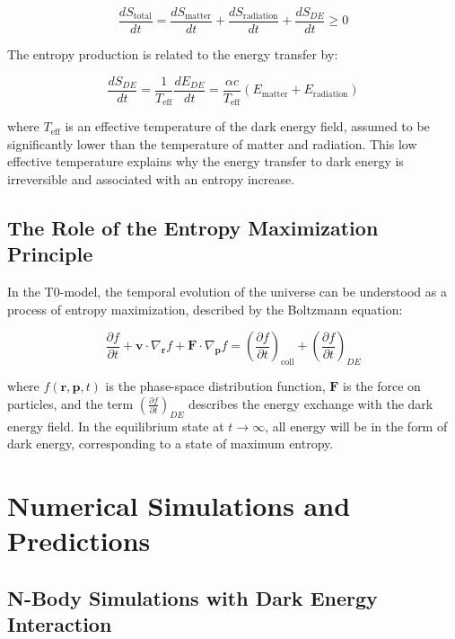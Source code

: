 \documentclass[a4paper,12pt]{article}
\theoremstyle{definition}
\theoremstyle{remark}
\begin{document}
	\begin{equation}
		\frac{dS_{\text{total}}}{dt} = \frac{dS_{\text{matter}}}{dt} + \frac{dS_{\text{radiation}}}{dt} + \frac{dS_{DE}}{dt} \geq 0
	\end{equation}
	
	The entropy production is related to the energy transfer by:
	
	\begin{equation}
		\frac{dS_{DE}}{dt} = \frac{1}{T_{\text{eff}}}\frac{dE_{DE}}{dt} = \frac{\alpha c}{T_{\text{eff}}}(E_{\text{matter}} + E_{\text{radiation}})
	\end{equation}
	
	where \(T_{\text{eff}}\) is an effective temperature of the dark energy field, assumed to be significantly lower than the temperature of matter and radiation. This low effective temperature explains why the energy transfer to dark energy is irreversible and associated with an entropy increase.
	
	\subsection{The Role of the Entropy Maximization Principle}
	
	In the T0-model, the temporal evolution of the universe can be understood as a process of entropy maximization, described by the Boltzmann equation:
	
	\begin{equation}
		\frac{\partial f}{\partial t} + \mathbf{v} \cdot \nabla_{\mathbf{r}} f + \mathbf{F} \cdot \nabla_{\mathbf{p}} f = \left(\frac{\partial f}{\partial t}\right)_{\text{coll}} + \left(\frac{\partial f}{\partial t}\right)_{DE}
	\end{equation}
	
	where \(f(\mathbf{r}, \mathbf{p}, t)\) is the phase-space distribution function, \(\mathbf{F}\) is the force on particles, and the term \(\left(\frac{\partial f}{\partial t}\right)_{DE}\) describes the energy exchange with the dark energy field. In the equilibrium state at \(t \rightarrow \infty\), all energy will be in the form of dark energy, corresponding to a state of maximum entropy.
	
	\section{Numerical Simulations and Predictions}
	
	\subsection{N-Body Simulations with Dark Energy Interaction}
	
\end{document}
